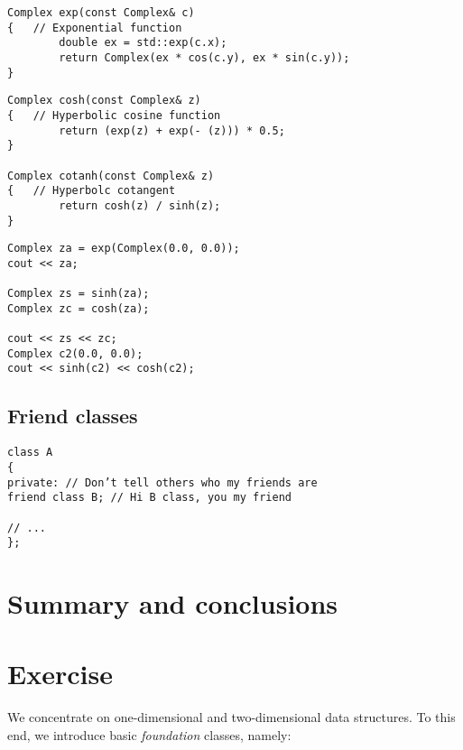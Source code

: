 \begin{lstlisting}
Complex exp(const Complex& c)
{	// Exponential function
		double ex = std::exp(c.x);
		return Complex(ex * cos(c.y), ex * sin(c.y));
}
\end{lstlisting}

\begin{lstlisting}
Complex cosh(const Complex& z)
{	// Hyperbolic cosine function
		return (exp(z) + exp(- (z))) * 0.5;
}

Complex cotanh(const Complex& z)
{	// Hyperbolc cotangent
		return cosh(z) / sinh(z);
}
\end{lstlisting}

\begin{lstlisting}
Complex za = exp(Complex(0.0, 0.0));
cout << za;

Complex zs = sinh(za);
Complex zc = cosh(za);

cout << zs << zc;
Complex c2(0.0, 0.0);
cout << sinh(c2) << cosh(c2);
\end{lstlisting}

\subsection{Friend classes}

\begin{lstlisting}
class A
{
private: // Don’t tell others who my friends are
friend class B; // Hi B class, you my friend

// ...
};
\end{lstlisting}



\section{Summary and conclusions}

\section{Exercise}




We concentrate on one-dimensional and two-dimensional data structures. To this end, we introduce basic \textit{foundation} classes, namely:

